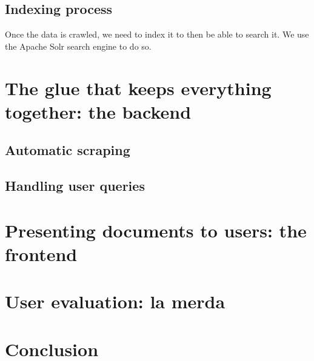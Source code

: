 \documentclass[tikz,14pt]{article}
\begin{document}
\subsection{Indexing process} \label{sec:indexing}
Once the data is crawled, we need to index it to then be able to search it.
We use the Apache Solr search engine to do so. 

\section{The glue that keeps everything together: the backend} \label{sec:backend}
\subsection{Automatic scraping} \label{sec:scraping}
\subsection{Handling user queries} \label{sec:queries}

\section{Presenting documents to users: the frontend} \label{sec:frontend}

\section{User evaluation: la merda} \label{sec:evaluation}

\section{Conclusion}



\clearpage
\end{document}
